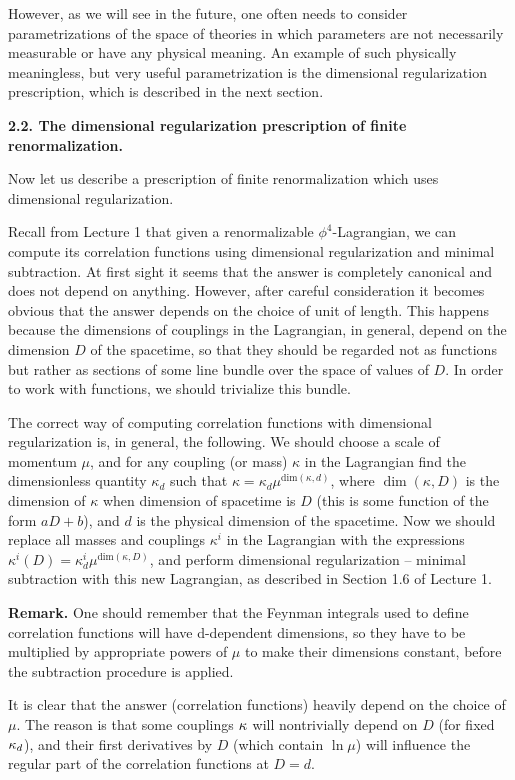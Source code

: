 However, as we will see in the future,
one often needs to consider parametrizations of the space of theories 
in which parameters are not necessarily measurable
or have any physical meaning. An example of such 
physically meaningless, but very useful parametrization  
is the dimensional regularization prescription, which is described in
the next section. 

{\bf 2.2.
The dimensional regularization prescription of finite renormalization.}

Now let us describe a prescription of finite 
renormalization which uses dimensional regularization. 

Recall from Lecture 1 that given a renormalizable $\phi^4$-Lagrangian,
we can compute its correlation functions using dimensional regularization
and minimal subtraction. At first sight it seems that the answer is completely
canonical and does not depend on anything. 
However, after careful consideration 
it becomes obvious that the answer depends on the choice 
of unit of length. This happens because the dimensions
of couplings in the Lagrangian, in general, 
depend on the dimension $D$ of the spacetime, so that they should be regarded 
not as functions but rather as sections of some line bundle
over the space of values of $D$. In order to work with functions,
we should trivialize this bundle. 

The correct way of computing correlation functions with dimensional 
regularization is, in general, the following. We should 
choose a scale of momentum $\mu$, and for any  
coupling (or mass) $\kappa$ in the Lagrangian find the dimensionless 
quantity $\kappa_d$ such that 
$\kappa=\kappa_d\mu^{\text{dim}(\kappa,d)}$, where
$\dim(\kappa,D)$ is the dimension of $\kappa$ 
when dimension of spacetime is $D$ (this is some 
function of the form $aD+b$), and $d$ is the physical dimension 
of the spacetime. Now we should
replace all masses and couplings 
$\kappa^i$ in the Lagrangian with the expressions 
$\kappa^i(D)=\kappa^i_d\mu^{\text{dim}(\kappa,D)}$, and  
perform dimensional regularization -- minimal subtraction 
with this new Lagrangian, as 
described in Section 1.6 of Lecture 1. 

{\bf Remark.} One should remember that the 
Feynman integrals used to define correlation functions 
will have d-dependent dimensions, so they have to be multiplied 
by appropriate powers of $\mu$ to make their dimensions constant, before 
the subtraction procedure is applied. 

It is clear that the answer 
(correlation functions) heavily depend on the choice of $\mu$. 
The reason is that some couplings $\kappa$ will nontrivially depend 
on $D$ (for fixed $\kappa_d$), and their first derivatives by $D$ 
(which contain $\ln \mu$) will influence the regular part of the 
correlation functions at $D=d$. 

